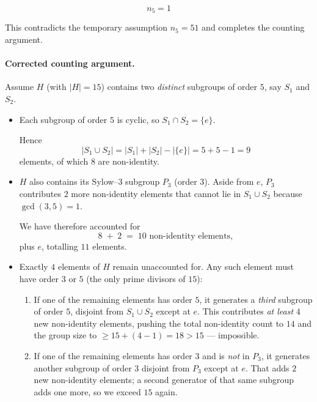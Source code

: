 \documentclass[12pt]{article}
\theoremstyle{definition} %
\theoremstyle{plain} %
\begin{document}
\[
\boxed{\;n_{5}=1\;}
\]

This contradicts the temporary assumption \(n_{5}=51\) and completes
the counting argument.
\paragraph{Corrected counting argument.}

Assume $H$ (with $\lvert H\rvert = 15$) contains two \emph{distinct}
subgroups of order $5$, say $S_1$ and $S_2$.

\begin{itemize}
    \item Each subgroup of order $5$ is cyclic, so
          $S_1 \cap S_2 = \{e\}$.

          Hence
          \[
              \lvert S_1 \cup S_2\rvert
              = \lvert S_1\rvert + \lvert S_2\rvert - \lvert\{e\}\rvert
              = 5 + 5 - 1
              = 9
          \]
          elements, of which $8$ are non-identity.

    \item $H$ also contains its Sylow–$3$ subgroup
          $P_3$ (order $3$).  Aside from $e$, $P_3$ contributes
          $2$ more non-identity elements that
          cannot lie in $S_1 \cup S_2$ because $\gcd(3,5)=1$.

          We have therefore accounted for
          \[
              8 \;+\; 2 \;=\; 10 \text{ non-identity elements},
          \]
          plus $e$, totalling $11$ elements.

    \item Exactly $4$ elements of $H$ remain unaccounted for.
          Any such element must have order $3$ or $5$ (the only prime
          divisors of $15$):

          \begin{enumerate}
              \item If one of the remaining elements has order $5$,
                    it generates a \emph{third} subgroup of order $5$,
                    disjoint from $S_1\cup S_2$ except at $e$.
                    This contributes \emph{at least} $4$ new
                    non-identity elements, pushing the total
                    non-identity count to $14$ and the group size to
                    $\ge 15 + (4-1) = 18 > 15$ — impossible.

              \item If one of the remaining elements has order $3$ and
                    is \emph{not} in $P_3$, it generates another
                    subgroup of order $3$ disjoint from $P_3$ except at
                    $e$.  That adds $2$ new non-identity elements; a
                    second generator of that same subgroup adds one more,
                    so we exceed $15$ again.
          \end{enumerate}
\end{itemize}
\end{document}
